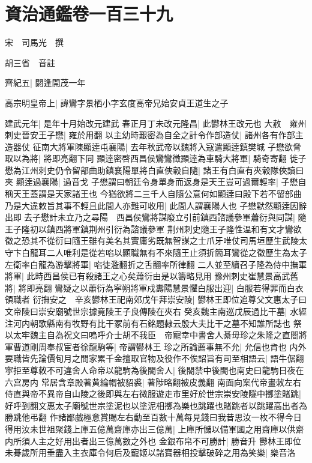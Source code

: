 \section{資治通鑑卷一百三十九}
宋　司馬光　撰

胡三省　音註

齊紀五|{
	閼逢開茂一年}


高宗明皇帝上|{
	諱鸞字景栖小字玄度高帝兄始安貞王道生之子}


建武元年|{
	是年十月始改元建武}
春正月丁未改元隆昌|{
	此鬰林王改元也}
大赦　雍州刺史晉安王子懋|{
	雍於用翻}
以主幼時艱密為自全之計令作部造仗|{
	諸州各有作部主造器仗}
征南大將軍陳顯逹屯襄陽|{
	去年秋武帝以魏將入寇遣顯逹鎮樊城}
子懋欲脅取以為將|{
	將即亮翻下同}
顯逹密啓西昌侯鸞鸞徵顯逹為車騎大將軍|{
	騎奇寄翻}
徙子懋為江州刺史仍令留部曲助鎮襄陽單將白直俠轂自隨|{
	諸王有白直有夾轂隊俠讀曰夾}
顯逹過襄陽|{
	過音戈}
子懋謂曰朝廷令身單身而返身是天王豈可過爾輕率|{
	子懋自稱天王蓋謂是天家諸王也}
今猶欲將二三千人自隨公意何如顯逹曰殿下若不留部曲乃是大違敕旨其事不輕且此間人亦難可收用|{
	此間人謂襄陽人也}
子懋默然顯逹因辭出即去子懋計未立乃之尋陽　西昌侯鸞將謀廢立引前鎮西諮議參軍蕭衍與同謀|{
	隨王子隆初以鎮西將軍鎮荆州引衍為諮議參軍}
荆州刺史隨王子隆性温和有文才鸞欲徵之恐其不從衍曰隨王雖有美名其實庸劣既無智謀之士爪牙唯仗司馬垣歷生武陵太守卞白龍耳二人唯利是從若啗以顯職無有不來隨王止須折簡耳鸞從之徵歷生為太子左衛率白龍為游擊將軍|{
	啗徒濫翻折之舌翻率所律翻}
二人並至續召子隆為侍中撫軍將軍|{
	此時西昌侯已有殺諸王之心矣蕭衍由是以籌略見用}
豫州刺史崔慧景高武舊將|{
	將即亮翻}
鸞疑之以蕭衍為寜朔將軍戍夀陽慧景懼白服出迎|{
	白服若得罪而白衣領職者}
衍撫安之　辛亥鬰林王祀南郊戊午拜崇安陵|{
	鬰林王即位追尊父文惠太子曰文帝陵曰崇安廟號世宗據竟陵王子良傳陵在夾右}
癸亥魏主南巡戊辰過比干墓|{
	水經注河内朝歌縣南有牧野有比干冢前有石銘題隸云殷大夫比干之墓不知誰所誌也}
祭以太牢魏主自為祝文曰嗚呼介士胡不我臣　帝寵幸中書舍人綦毋珍之朱隆之直閤將軍曹道剛周奉叔宦者徐龍駒等|{
	帝謂鬰林王}
珍之所論薦事無不允|{
	允信也肯也}
内外要職皆先論價旬月之間家累千金擅取官物及役作不俟詔旨有司至相語云|{
	語牛倨翻}
寜拒至尊敇不可違舍人命帝以龍駒為後閤舍人|{
	後閤禁中後閤也南史曰龍駒日夜在六宫房内}
常居含章殿著黄綸㡌被貂裘|{
	著陟略翻被皮義翻}
南面向案代帝畫敇左右侍直與帝不異帝自山陵之後即與左右微服遊走市里好於世宗崇安陵隧中擲塗賭跳|{
	好呼到翻文惠太子廟號世宗塗泥也以塗泥相擲為樂也跳躍也賭跳者以跳躍高出者為勝跳他弔翻}
作諸鄙戲極意賞賜左右動至百數十萬每見錢曰我昔思汝一枚不得今日得用汝未世祖聚錢上庫五億萬齋庫亦出三億萬|{
	上庫所儲以備軍國之用齋庫以供齋内所須人主之好用出者出三億萬數之外也}
金銀布帛不可勝計|{
	勝音升}
鬰林王即位未朞歲所用垂盡入主衣庫令何后及寵姬以諸寶器相投擊破碎之用為笑樂|{
	樂音洛}
